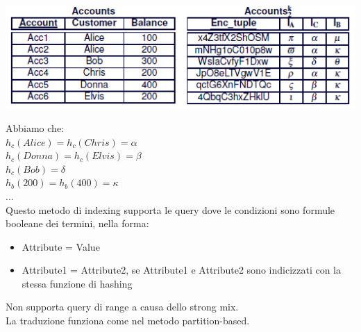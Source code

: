 \begin{center}
    \includegraphics[scale=0.6]{img/hashindex.png}
\end{center}
Abbiamo che:\\
\(h_c(Alice) = h_c(Chris) = \alpha \) \\
\(h_c(Donna) = h_c(Elvis) = \beta \) \\
\(h_c(Bob) = \delta \) \\
\(h_b(200) = h_b(400) = \kappa \) \\
...\\
Questo metodo di indexing supporta le query dove le condizioni sono formule booleane dei termini, nella forma:
\begin{itemize}
    \item Attribute = Value
    \item Attribute1 = Attribute2, se Attribute1 e Attribute2 sono indicizzati con la stessa funzione di hashing
\end{itemize}
Non supporta query di range a causa dello strong mix. \\ La traduzione funziona come nel metodo partition-based.

